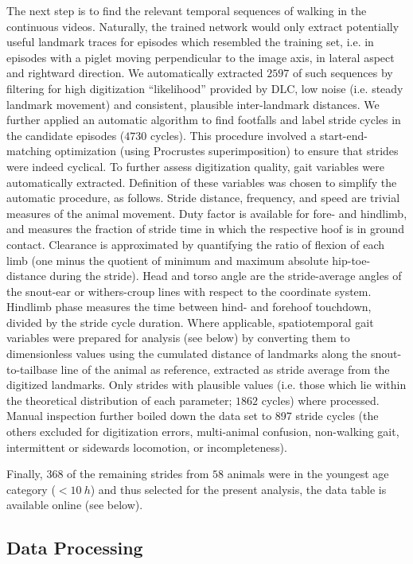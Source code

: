 The next step is to find the relevant temporal sequences of walking in the continuous videos.
Naturally, the trained network would only extract potentially useful landmark traces for episodes which resembled the training set, i.e. in episodes with a piglet moving perpendicular to the image axis, in lateral aspect and rightward direction.
We automatically extracted \(2597\) of such sequences by filtering for high digitization ``likelihood'' provided by DLC, low noise (i.e. steady landmark movement) and consistent, plausible inter-landmark distances.
We further applied an automatic algorithm to find footfalls and label stride cycles in the candidate episodes (\(4730\) cycles).
This procedure involved a start-end-matching optimization (using Procrustes superimposition) to ensure that strides were indeed cyclical.
To further assess digitization quality, gait variables were automatically extracted.
Definition of these variables was chosen to simplify the automatic procedure, as follows.
Stride distance, frequency, and speed are trivial measures of the animal movement.
Duty factor is available for fore- and hindlimb, and measures the fraction of stride time in which the respective hoof is in ground contact.
Clearance is approximated by quantifying the ratio of flexion of each limb (one minus the quotient of minimum and maximum absolute hip-toe-distance during the stride).
Head and torso angle are the stride-average angles of the snout-ear or withers-croup lines with respect to the coordinate system.
Hindlimb phase measures the time between hind- and forehoof touchdown, divided by the stride cycle duration.
Where applicable, spatiotemporal gait variables were prepared for analysis (see below) by converting them to dimensionless values \citep{Hof1996,Alexander1983} using the cumulated distance of landmarks along the snout-to-tailbase line of the animal as reference, extracted as stride average from the digitized landmarks.
Only strides with plausible values (i.e. those which lie within the theoretical distribution of each parameter; \(1862\) cycles) where processed.
Manual inspection further boiled down the data set to 897 stride cycles (the others excluded for digitization errors, multi-animal confusion, non-walking gait, intermittent or sidewards locomotion, or incompleteness).

Finally, \(368\) of the remaining strides from \(58\) animals were in the youngest age category (\(<10\ h\)) and thus selected for the present analysis, the data table is available online (see below).


\subsection{Data Processing}
\label{sec:orgcb0a26c}

